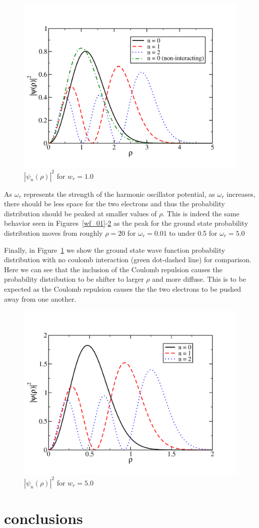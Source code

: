 \documentclass[prc,amsmath,twocolumn,superscriptaddress]{revtex4}
\begin{document}
\begin{figure}[t]
\includegraphics[scale=0.33]{wf_1.pdf}
\caption{$|\psi_n(\rho)|^2$ for $w_r = 1.0$}
\label{wf_1}
\end{figure}

As $\omega_r$ represents the strength of the harmonic oscillator potential, as $\omega_r$ increases, there should be less space for the two electrons and thus the probability distribution should be peaked at smaller values of $\rho$. This is indeed the same behavior seen in Figures~\ref{wf_01}-\ref{wf_5} as the peak for the ground state probability distribution moves from roughly $\rho=20$ for $\omega_r=0.01$ to under 0.5 for $\omega_r=5.0$

Finally, in Figure~\ref{wf_1} we show the ground state wave function probability distribution with no coulomb interaction (green dot-dashed line) for comparison. Here we can see that the inclusion of the Coulomb repulsion causes the probability distribution to be shifter to larger $\rho$ and more diffuse. This is to be expected as the Coulomb repulsion causes the the two electrons to be pushed away from one another.

\begin{figure}[b]
\includegraphics[scale=0.33]{wf_5.pdf}
\caption{$|\psi_n(\rho)|^2$ for $w_r = 5.0$}
\label{wf_5}
\end{figure}

\section{conclusions}
\label{conc}


\end{document}
